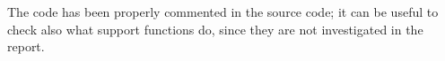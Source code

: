 The code has been properly commented in the source code; it can be useful to check also what support functions do, since they are not investigated in the report.

